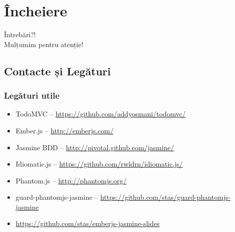 \documentclass[compress]{beamer}
\begin{document}
\section{Încheiere}

\begin{frame}
  \begin{center}
  \huge Întrebări?!
  \\
  Mulțumim pentru atenție!
  \end{center}
\end{frame}

\subsection{Contacte și Legături}

\begin{frame}
\frametitle{Legături utile}

\begin{itemize}
  \item TodoMVC -- \url{https://github.com/addyosmani/todomvc/}
  \item Ember.js -- \url{http://emberjs.com/}
  \item Jasmine BDD -- \url{http://pivotal.github.com/jasmine/}
  \item Idiomatic.js -- \url{https://github.com/rwldrn/idiomatic.js/}
  \item Phantom.js -- \url{http://phantomjs.org/}
  \item guard-phantomjs-jasmine -- \url{https://github.com/stas/guard-phantomjs-jasmine}
  \item \url{https://github.com/stas/emberjs-jasmine-slides}
\end{itemize}

\end{frame}
\end{document}
